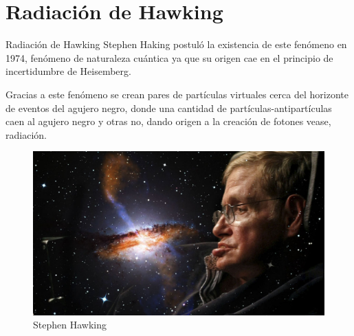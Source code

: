 \documentclass{beamer}
\begin{document}
\section{Radiaci\'on de Hawking}
\begin{frame}{Radiación de Hawking}
    Stephen Haking postuló la existencia de este fenómeno en 1974, fenómeno de naturaleza cuántica ya que su origen cae en el principio de incertidumbre de Heisemberg.
    \par
    Gracias a este fenómeno se crean pares de partículas virtuales cerca del horizonte de eventos del agujero negro, donde una cantidad de partículas-antipartículas caen al agujero negro y otras no, dando origen a la creación de fotones vease, radiación.
    \begin{figure}[h]
        \centering
        \includegraphics[scale = 0.13]{Estefano.jpg}
        \caption{Stephen Hawking}
        \label{fig:Estefano}
    \end{figure}
   
\end{frame}
\end{document}
